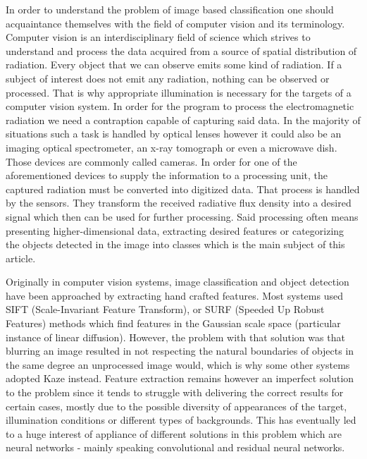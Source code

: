 \documentclass{ijisa}
\begin{document}
In order to understand the problem of image based classification one should acquaintance themselves with the field of computer vision and its terminology. Computer vision is an interdisciplinary field of science which strives to understand and process the data acquired from a source of spatial distribution of radiation\cite{wiki:computervision}. Every object that we can observe emits some kind of radiation. If a subject of interest does not emit any radiation, nothing can be observed or processed. That is why appropriate illumination is necessary for the targets of a computer vision system. In order for the program to process the electromagnetic radiation we need a contraption capable of capturing said data. In the majority of situations such a task is handled by optical lenses however it could also be an imaging optical spectrometer, an x-ray tomograph or even a microwave dish. Those devices are commonly called cameras. In order for one of the aforementioned devices to supply the information to a processing unit, the captured radiation must be converted into digitized data. That process is handled by the sensors. They transform the received radiative flux density into a desired signal which then can be used for further processing\cite{jahne2000computer}. Said processing often means presenting higher-dimensional data, extracting desired features or categorizing the objects detected in the image into classes which is the main subject of this article.
 
Originally in computer vision systems, image classification and object detection have been approached by extracting hand crafted features. Most systems used SIFT (Scale-Invariant Feature Transform)\cite{lowe2004distinctive}, or SURF (Speeded Up Robust Features)\cite{bay2008speeded} methods which find features in the Gaussian scale space (particular instance of linear diffusion). However, the problem with that solution was that blurring an image resulted in not respecting the natural boundaries of objects in the same degree an unprocessed image would, which is why some other systems adopted Kaze\cite{Alcantarilla13bmvc} instead. Feature extraction remains however an imperfect solution to the problem since it tends to struggle with delivering the correct results for certain cases, mostly due to the possible diversity of appearances of the target, illumination conditions or different types of backgrounds. This has eventually led to a huge interest of appliance of different solutions in this problem which are neural networks - mainly speaking convolutional and residual neural networks. 
\end{document}
